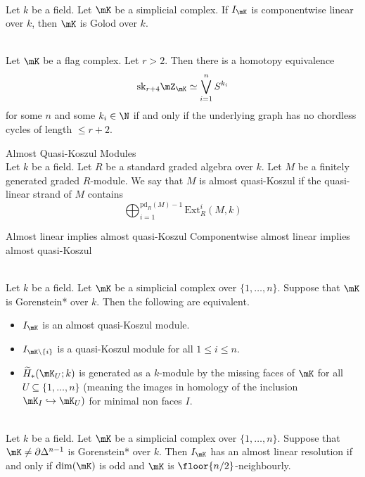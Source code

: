 \documentclass[a4paper]{article}
\begin{document}
\begin{crl}{}{}\\
Let $k$ be a field. Let $\mK$ be a simplicial complex. If $I_\mK$ is componentwise linear over $k$, then $\mK$ is Golod over $k$. 
\end{crl}

\begin{prp}{}{}\\
Let $\mK$ be a flag complex. Let $r>2$. Then there is a homotopy equivalence $$\text{sk}_{r+4}\mZ_\mK\simeq\bigvee_{i=1}^nS^{k_i}$$ for some $n$ and some $k_i\in\N$ if and only if the underlying graph has no chordless cycles of length $\leq r+2$. 
\end{prp}

\begin{defn}{Almost Quasi-Koszul Modules}{}\\
Let $k$ be a field. Let $R$ be a standard graded algebra over $k$. Let $M$ be a finitely generated graded $R$-module. We say that $M$ is almost quasi-Koszul if the quasi-linear strand of $M$ contains $$\bigoplus_{i=1}^{\text{pd}_R(M)-1}\text{Ext}_R^i(M,k)$$
\end{defn}

Almost linear implies almost quasi-Koszul
Componentwise almost linear implies almost quasi-Koszul

\begin{prp}{}{}\\
Let $k$ be a field. Let $\mK$ be a simplicial complex over $\{1,\dots,n\}$. Suppose that $\mK$ is Gorenstein* over $k$. Then the following are equivalent. 
\begin{itemize}
\item $I_\mK$ is an almost quasi-Koszul module. 
\item $I_{\mK\setminus\{i\}}$ is a quasi-Koszul module for all $1\leq i\leq n$. 
\item $\widetilde{H}_\ast(\mK_U;k)$ is generated as a $k$-module by the missing faces of $\mK$ for all $U\subseteq\{1,\dots,n\}$ (meaning the images in homology of the inclusion $\mK_I\hookrightarrow\mK_U)$ for minimal non faces $I$. 
\end{itemize}
\end{prp}

\begin{prp}{}{}\\
Let $k$ be a field. Let $\mK$ be a simplicial complex over $\{1,\dots,n\}$. Suppose that $\mK\neq\partial\Delta^{n-1}$ is Gorenstein* over $k$. Then $I_\mK$ has an almost linear resolution if and only if $\dim(\mK)$ is odd and $\mK$ is $\floor{n/2}$-neighbourly. 
\end{prp}
\end{document}
